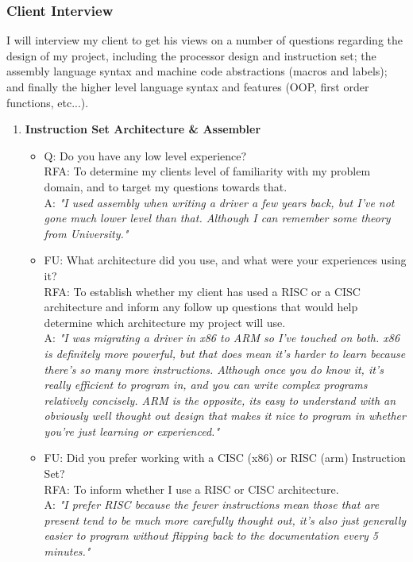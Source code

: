 \subsubsection{Client Interview}
\label{sec:Interview}
I will interview my client to get his views on a number of questions regarding the design of my project, including the processor design and instruction set; the assembly language syntax and   machine code abstractions (macros and labels); and finally the higher level language syntax and features (OOP, first order functions, etc...).  
\begin{enumerate}
    \item \textbf{Instruction Set Architecture \& Assembler}
        \begin{itemize}
            \item Q: Do you have any low level experience? \\
                RFA: To determine my clients level of familiarity with my problem domain, and to target my questions towards that.\\
                A: \textit{"I used assembly when writing a driver a few years back, but I've not gone much lower level than that. Although I can remember some theory from University."}
            \item FU: What architecture did you use, and what were your experiences using it? \\
                RFA: To establish whether my client has used a RISC or a CISC architecture and inform any follow up questions that would help determine which architecture my project will use. \\
                A: \textit{"I was migrating a driver in x86 to ARM so I've touched on both. x86 is definitely more powerful, but that does mean it's harder to learn because there's so many more instructions. Although once you do know it, it's really efficient to program in, and you can write complex programs relatively concisely. ARM is the opposite, its easy to understand with an obviously well thought out design that makes it nice to program in whether you're just learning or experienced."}
            \item FU: Did you prefer working with a CISC (x86) or RISC (arm) Instruction Set? \\
                RFA: To inform whether I use a RISC or CISC architecture.\\
                A: \textit{"I prefer RISC because the fewer instructions mean those that are present tend to be much more carefully thought out, it's also just generally easier to program without flipping back to the documentation every 5 minutes."}

\end{itemize}
\end{enumerate}
